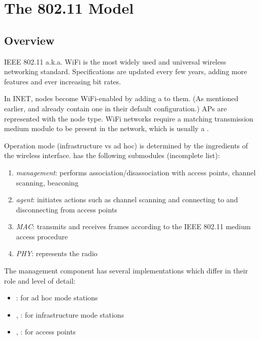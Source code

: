 \chapter{The 802.11 Model}
\label{cha:80211}


\section{Overview}
\label{sec:80211:overview}

IEEE 802.11 a.k.a. WiFi is the most widely used and universal wireless networking
standard. Specifications are updated every few years, adding more features and
ever increasing bit rates. 

In INET, nodes become WiFi-enabled by adding a  to
them. (As mentioned earlier,  and  already
contain one in their default configuration.) APs are represented with the
 node type. WiFi networks require a matching transmission
medium module to be present in the network, which is usually a 
.

Operation mode (infrastructure vs ad hoc) is determined by the
ingredients of the wireless interface.  has
the following submodules (incomplete list): 

\begin{enumerate}
  \item \textit{management}: performs association/disassociation with access points, channel scanning, beaconing
  \item \textit{agent}: initiates actions such as channel scanning and connecting to and disconnecting from access points
  \item \textit{MAC}: transmits and receives frames according to the IEEE 802.11 medium access procedure
  \item \textit{PHY}: represents the radio
\end{enumerate}

The management component has several implementations which differ in their role
and level of detail:

\begin{itemize}
  \item {}: for ad hoc mode stations
  \item {}, : for infrastructure mode stations
  \item {}, : for access points
\end{itemize}

